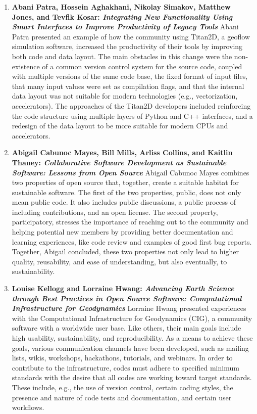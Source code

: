 \documentclass[11pt, oneside]{amsart}
\begin{document}
\begin{enumerate}
\item \textbf{Abani Patra, Hossein Aghakhani, Nikolay Simakov, Matthew Jones,
and Tevfik Kosar: \textit{Integrating New Functionality Using Smart Interfaces
to Improve Productivity of Legacy Tools}} Abani Patra presented an example of
how the community using Titan2D, a geoflow simulation software, increased the
productivity of their tools by improving both code and data layout. The main
obstacles in this change were the non-existence of a common version control
system for the source code, coupled with multiple versions of the same code
base, the fixed format of input files, that many input values were set as
compilation flags, and that the internal data layout was not suitable for modern
technologies (e.g., vectorization, accelerators). The approaches of the Titan2D
developers included reinforcing the code structure using multiple layers of
Python and C++ interfaces, and a redesign of the data layout to be more suitable
for modern CPUs and accelerators.

\item \textbf{Abigail Cabunoc Mayes, Bill Mills, Arliss Collins, and Kaitlin
Thaney: \textit{Collaborative Software Development as Sustainable Software:
Lessons from Open Source}} Abigail Cabunoc Mayes combines two properties of open
source that, together, create a suitable habitat for sustainable software. The
first of the two properties, public, does not only mean public code. It also
includes public discussions, a public process of including contributions, and an
open license. The second property, participatory, stresses the importance of
reaching out to the community and helping potential new members by providing
better documentation and learning experiences, like code review and examples of
good first bug reports. Together, Abigail concluded, these two properties not
only lead to higher quality, reusability, and ease of understanding, but also
eventually, to sustainability.

\item \textbf{Louise Kellogg and Lorraine Hwang: \textit{Advancing Earth Science
through Best Practices in Open Source Software: Computational Infrastructure for
Geodynamics}} Lorraine Hwang presented experiences with the Computational
Infrastructure for Geodynamics (CIG), a community software with a worldwide user
base. Like others, their main goals include high usability, sustainability, and
reproducibility. As a means to achieve these goals, various communication
channels have been developed, such as mailing lists, wikis, workshops,
hackathons, tutorials, and webinars. In order to contribute to the
infrastructure, codes must adhere to specified minimum standards with the desire
that all codes are working toward target standards.
These include, e.g., the use of version control, certain coding styles, the
presence and nature of code tests and documentation, and certain user workflows.


\end{enumerate}
\end{document}
